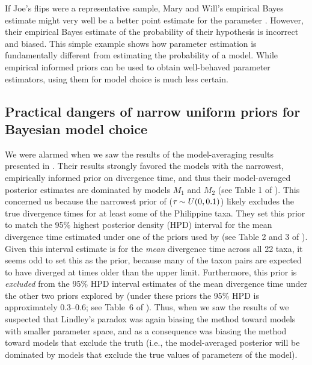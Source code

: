 \documentclass[letterpaper,12pt]{article}
\begin{document}
\begin{linenumbers}
If Joe's flips were a representative sample, Mary and Will's empirical Bayes
estimate might very well be a better point estimate for the parameter
\myTheta{}.
However, their empirical Bayes estimate of the probability of their hypothesis
is incorrect and biased.
This simple example shows how parameter estimation is fundamentally different
from estimating the probability of a model.
While empirical informed priors can be used to obtain well-behaved parameter
estimators, using them for model choice is much less certain.



\subsection*{Practical dangers of narrow uniform priors for Bayesian model
choice}
We were alarmed when we saw the results of the model-averaging results
presented in \citet{Hickerson2013}.
Their results strongly favored the models with the narrowest, empirically
informed prior on divergence time, and thus their model-averaged posterior
estimates are dominated by models $M_1$ and $M_2$ (see Table 1 of
\citet{Hickerson2013}).
This concerned us because the narrowest prior of \citet{Hickerson2013}
($\tau_{} \sim U(0,0.1)$) likely excludes the true divergence times for at
least some of the Philippine taxa.
They set this prior to match the 95\% highest posterior density (HPD) interval for
the mean divergence time estimated under one of the priors used by
\citet{Oaks2012} (see Table 2 and 3 of \citet{Oaks2012}).
Given this interval estimate is for the \emph{mean} divergence time across all
22 taxa, it seems odd to set this as the prior, because many of the taxon pairs
are expected to have diverged at times older than the upper limit.
Furthermore, this prior is \emph{excluded} from the 95\% HPD interval estimates
of the mean divergence time under the other two priors explored by
\citet{Oaks2012} (under these priors the 95\% HPD is approximately 0.3--0.6;
see Table~6 of \citet{Oaks2012}).
Thus, when we saw the results of \citet{Hickerson2013} we suspected that
Lindley's paradox was again biasing the method toward models with smaller
parameter space, and as a consequence was biasing the method toward models
that exclude the truth (i.e., the model-averaged posterior will
be dominated by models that exclude the true values of parameters of the model).


\end{linenumbers}
\end{document}

